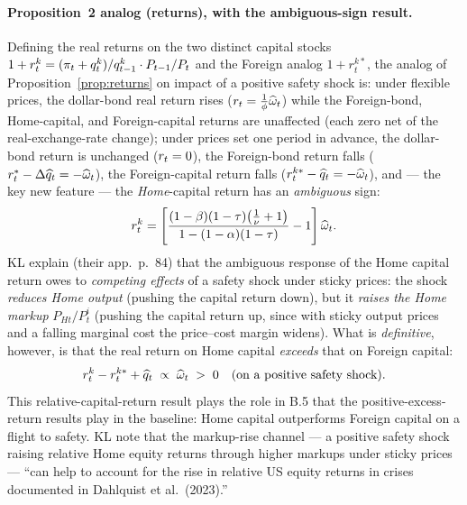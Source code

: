 \paragraph{Proposition~2 analog (returns), with the ambiguous-sign result.}
Defining the real returns on the two distinct capital stocks
$1+r^{k}_t=(\pi_t+q^{k}_t)/q^{k}_{t-1}\cdot P_{t-1}/P_t$ and the Foreign analog
$1+r^{k*}_t$, the analog of Proposition~\ref{prop:returns} on impact of a
positive safety shock is: under flexible prices, the dollar-bond real return rises
($r_t=\frac{1}{\phi}\widehat{\omega}_t$) while the Foreign-bond, Home-capital, and
Foreign-capital returns are unaffected (each zero net of the real-exchange-rate
change); under prices set one period in advance, the dollar-bond return is
unchanged ($r_t=0$), the Foreign-bond return falls
($r^{*}_t-\Delta\widehat{q}_t=-\widehat{\omega}_t$), the Foreign-capital return falls
($r^{k*}_t-\widehat{q}_t=-\widehat{\omega}_t$), and --- the key new feature --- the
\emph{Home}-capital return has an \emph{ambiguous} sign:
\begin{equation}
r^{k}_t = \left[\frac{(1-\beta)(1-\tau)\bigl(\tfrac{1}{\nu}+1\bigr)}{1-(1-\alpha)(1-\tau)}-1\right]\widehat{\omega}_t. \label{eq:b5-rk-ambiguous}
\end{equation}
KL explain (their app.~p.~84) that the ambiguous response of the Home capital
return owes to \emph{competing effects} of a safety shock under sticky prices: the
shock \emph{reduces Home output} (pushing the capital return down), but it
\emph{raises the Home markup} $P_{Ht}/P^{i}_t$ (pushing the capital return up,
since with sticky output prices and a falling marginal cost the price--cost margin
widens). What is \emph{definitive}, however, is that the real return on Home
capital \emph{exceeds} that on Foreign capital:
\begin{equation}
r^{k}_t - r^{k*}_t + \widehat{q}_t \;\propto\; \widehat{\omega}_t \;>\;0 \quad\text{(on a positive safety shock).} \label{eq:b5-rk-gap}
\end{equation}
This relative-capital-return result plays the role in B.5 that the
positive-excess-return results play in the baseline: Home capital outperforms
Foreign capital on a flight to safety. KL note that the markup-rise channel --- a
positive safety shock raising relative Home equity returns through higher markups
under sticky prices --- ``can help to account for the rise in relative US equity
returns in crises documented in Dahlquist et al.\ (2023).''


